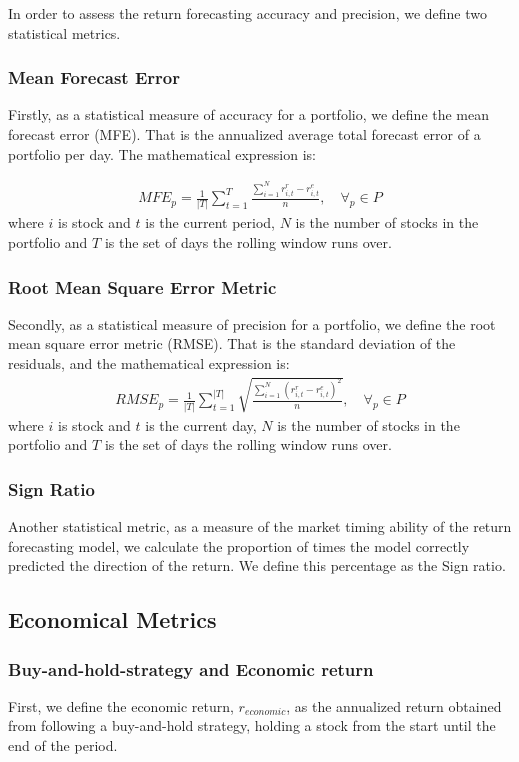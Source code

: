 In order to assess the return forecasting accuracy and precision, we define two statistical metrics. 

\subsubsection{Mean Forecast Error}
Firstly, as a statistical measure of accuracy for a portfolio, we define the mean forecast error (MFE). That is the annualized average total forecast error of a portfolio per day. The mathematical expression is:

\begin{align}
    MFE_{p} =  \frac{1}{|T|}\sum_{t=1}^{T}\frac{\sum_{i=1}^{N}r_{i,t}^{r} - r_{i,t}^{e}}{n}, \quad \forall_p \in P
\end{align}
where $i$ is stock and $t$ is the current period, $N$ is the number of stocks in the portfolio and $T$ is the set of days the rolling window runs over.

\subsubsection{Root Mean Square Error Metric}
Secondly, as a statistical measure of precision for a portfolio, we define the root mean square error metric (RMSE). That is the standard deviation of the residuals, and the mathematical expression is:
\begin{align}
    RMSE_{p} = \frac{1}{|T|}\sum_{t=1}^{|T|}\sqrt{\frac{\sum_{i=1}^{N}(r_{i,t}^{r} - r_{i,t}^{e})^{2}}{n}}, \quad \forall_p \in P
\end{align}
where $i$ is stock and $t$ is the current day, $N$ is the number of stocks in the portfolio and $T$ is the set of days the rolling window runs over.

\subsubsection{Sign Ratio}
Another statistical metric, as a measure of the market timing ability of the return forecasting model, we calculate the proportion of times the model correctly predicted the direction of the return. We define this percentage as the Sign ratio.

\subsection{Economical Metrics}

\subsubsection{Buy-and-hold-strategy and Economic return}
First, we define the economic return, $r_{economic}$, as the annualized return obtained from following a buy-and-hold strategy, holding a stock from the start until the end of the period. 

